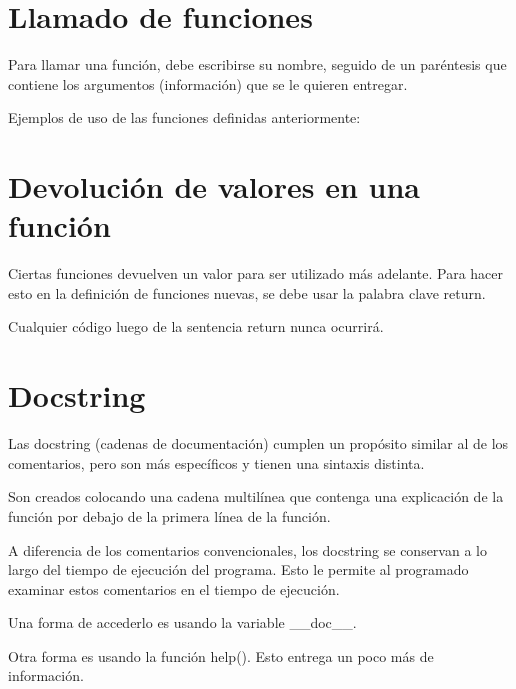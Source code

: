 \documentclass{report}
\begin{document}
{\section{Llamado de funciones}

Para llamar una función, debe escribirse su nombre, seguido de un paréntesis que contiene los argumentos (información) que se le quieren entregar.

Ejemplos de uso de las funciones definidas anteriormente:


\section{Devolución de valores en una función}

Ciertas funciones devuelven un valor para ser utilizado más adelante. Para hacer esto en la definición de funciones nuevas, se debe usar la palabra clave return.


Cualquier código luego de la sentencia return nunca ocurrirá.


\section{Docstring}

Las docstring (cadenas de documentación) cumplen un propósito similar al de los comentarios, pero son más específicos y tienen una sintaxis distinta.

Son creados colocando una cadena multilínea que contenga una explicación de la función por debajo de la primera línea de la función.


A diferencia de los comentarios convencionales, los docstring se conservan a lo largo del tiempo de ejecución del programa. Esto le permite al programado examinar estos comentarios en el tiempo de ejecución.

Una forma de accederlo es usando la variable \_\_doc\_\_.


Otra forma es usando la función help(). Esto entrega un poco más de información.


}
\end{document}
